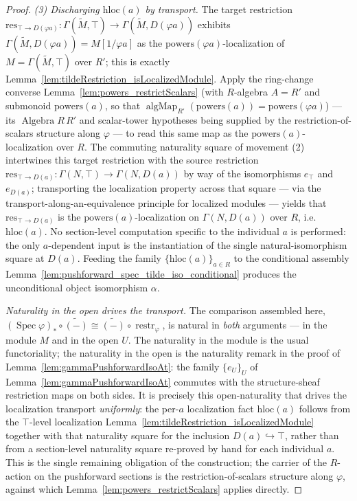 \begin{proof}
  \emph{(3) Discharging \(\mathrm{hloc}(a)\) by transport.} The target restriction
  \(\mathrm{res}_{\top \to D(\varphi a)} : \Gamma(\widetilde M, \top) \to
  \Gamma(\widetilde M, D(\varphi a))\) exhibits \(\Gamma(\widetilde M, D(\varphi a)) =
  M[1/\varphi a]\) as the \(\mathrm{powers}(\varphi a)\)-localization of
  \(M = \Gamma(\widetilde M, \top)\) over \(R'\); this is exactly
  Lemma~\ref{lem:tildeRestriction_isLocalizedModule}. Apply the ring-change converse
  Lemma~\ref{lem:powers_restrictScalars} (with \(R\)-algebra \(A = R'\) and submonoid
  \(\mathrm{powers}(a)\), so that
  \(\operatorname{algMap}_{R'}(\mathrm{powers}(a)) = \mathrm{powers}(\varphi a)\)) —
  its \(\operatorname{Algebra} R\, R'\) and scalar-tower hypotheses being supplied by
  the restriction-of-scalars structure along \(\varphi\) — to read this same map as
  the \(\mathrm{powers}(a)\)-localization over \(R\). The commuting naturality square
  of movement (2) intertwines this target restriction with the source restriction
  \(\mathrm{res}_{\top \to D(a)} : \Gamma(N, \top) \to \Gamma(N, D(a))\) by way of the
  isomorphisms \(e_\top\) and \(e_{D(a)}\); transporting the localization property
  across that square — via the transport-along-an-equivalence principle for localized
  modules — yields that \(\mathrm{res}_{\top \to D(a)}\) is the
  \(\mathrm{powers}(a)\)-localization on \(\Gamma(N, D(a))\) over \(R\), i.e.\
  \(\mathrm{hloc}(a)\). No section-level computation specific to the individual \(a\)
  is performed: the only \(a\)-dependent input is the instantiation of the single
  natural-isomorphism square at \(D(a)\). Feeding the family
  \(\{\mathrm{hloc}(a)\}_{a \in R}\) to the conditional assembly
  Lemma~\ref{lem:pushforward_spec_tilde_iso_conditional} produces the unconditional
  object isomorphism \(\alpha\).

  \medskip
  \emph{Naturality in the open drives the transport.} The comparison assembled
  here, \((\operatorname{Spec}\varphi)_* \circ \widetilde{(-)} \cong
  \widetilde{(-)} \circ \operatorname{restr}_\varphi\), is natural in \emph{both}
  arguments — in the module \(M\) and in the open \(U\). The naturality in the
  module is the usual functoriality; the naturality in the open is the naturality
  remark in the proof of Lemma~\ref{lem:gammaPushforwardIsoAt}: the family
  \(\{e_U\}_U\) of Lemma~\ref{lem:gammaPushforwardIsoAt} commutes with the
  structure-sheaf restriction maps on both sides. It is precisely this
  open-naturality that drives the localization transport \emph{uniformly}: the
  per-\(a\) localization fact \(\mathrm{hloc}(a)\) follows from the \(\top\)-level
  localization Lemma~\ref{lem:tildeRestriction_isLocalizedModule} together with that
  naturality square for the inclusion
  \(D(a) \hookrightarrow \top\), rather than from a section-level naturality square
  re-proved by hand for each individual \(a\). This is the single remaining
  obligation of the construction; the carrier of the \(R\)-action on the pushforward
  sections is the restriction-of-scalars structure along \(\varphi\), against which
  Lemma~\ref{lem:powers_restrictScalars} applies directly.


\end{proof}
